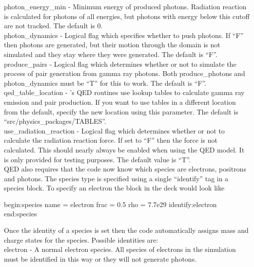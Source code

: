 {\emphtext photon\_energy\_min} - Minimum energy of produced photons.
  Radiation reaction is calculated for photons of all energies, but photons
  with energy below this cutoff are not tracked.  The default is 0.\\

{\emphtext photon\_dynamics} - Logical flag which specifies whether to push
  photons.  If ``F'' then photons are generated, but their motion through the
  domain is not simulated and they stay where they were generated. The default
  is ``F''.\\

{\emphtext produce\_pairs} - Logical flag which determines whether or not to
  simulate the process of pair generation from gamma ray photons.  Both
  produce\_photons and photon\_dynamics must be ``T'' for this to work. The
  default is ``F''.\\

{\emphtext qed\_table\_location} - {\EPOCH}'s QED routines use lookup tables to
  calculate gamma ray emission and pair production. If you want to use tables
  in a different location from the default, specify the new location using
  this parameter.  The default is ``src/physics\_packages/TABLES''.\\

{\emphtext use\_radiation\_reaction} - Logical flag which determines whether
  or not to calculate the radiation reaction force. If set to ``F'' then
  the force is not calculated. This should nearly always be enabled when
  using the QED model. It is only provided for testing purposes.
  The default value is ``T''.\\

QED also requires that the code now know which species are electrons,
positrons and photons. The species type is specified using a single
``identify'' tag in a species block. To specify an electron the block in the
deck would look like

\begin{boxverbatim}
begin:species
   name = electron
   frac = 0.5
   rho = 7.7e29
   identify:electron
end:species
\end{boxverbatim}

Once the identity of a species is set then the code automatically assigns
mass and charge states for the species.
Possible identities are:\\

{\emphtext electron} - A normal electron species. All species of electrons in
  the simulation must be identified in this way or they will not generate
  photons.\\

